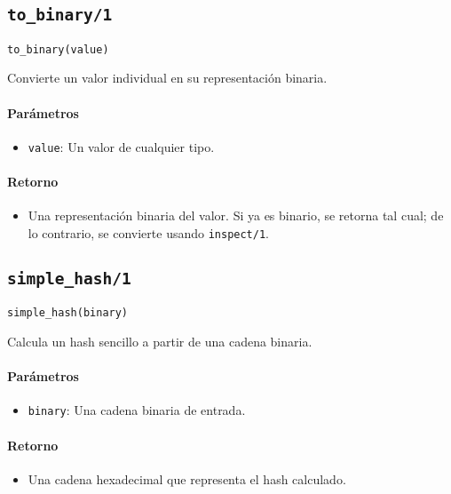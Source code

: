 {\subsection*{\texttt{to\_binary/1}}
\begin{verbatim}
to_binary(value)
\end{verbatim}

Convierte un valor individual en su representación binaria.

\paragraph{Parámetros}
\begin{itemize}
    \item \texttt{value}: Un valor de cualquier tipo.
\end{itemize}

\paragraph{Retorno}
\begin{itemize}
    \item Una representación binaria del valor. Si ya es binario, se retorna tal cual; de lo contrario, se convierte usando \texttt{inspect/1}.
\end{itemize}

\subsection*{\texttt{simple\_hash/1}}
\begin{verbatim}
simple_hash(binary)
\end{verbatim}

Calcula un hash sencillo a partir de una cadena binaria.

\paragraph{Parámetros}
\begin{itemize}
    \item \texttt{binary}: Una cadena binaria de entrada.
\end{itemize}

\paragraph{Retorno}
\begin{itemize}
    \item Una cadena hexadecimal que representa el hash calculado.
\end{itemize}

}
